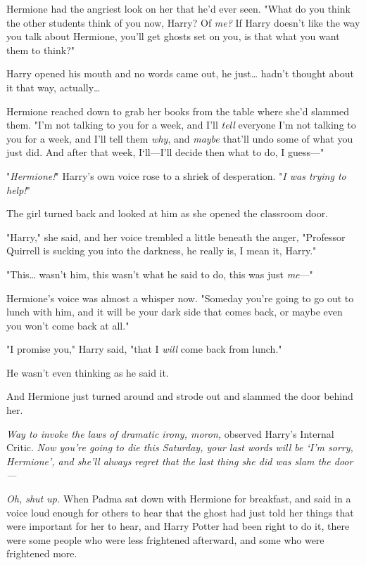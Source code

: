 Hermione had the angriest look on her that he'd ever seen. "What do you think 
the other students think of you now, Harry? Of \emph{me?} If Harry doesn't like 
the way you talk about Hermione, you'll get ghosts set on you, is that what you 
want them to think?"

Harry opened his mouth and no words came out, he just{\ldots} hadn't thought 
about it that way, actually{\ldots}

Hermione reached down to grab her books from the table where she'd slammed 
them. "I'm not talking to you for a week, and I'll \emph{tell} everyone I'm not 
talking to you for a week, and I'll tell them \emph{why}, and \emph{maybe} 
that'll undo some of what you just did. And after that week, I`ll---I'll decide 
then what to do, I guess---"

"\emph{Hermione!}" Harry's own voice rose to a shriek of desperation. "\emph{I 
was trying to help!}"

The girl turned back and looked at him as she opened the classroom door.

"Harry," she said, and her voice trembled a little beneath the anger, 
"Professor Quirrell is sucking you into the darkness, he really is, I mean it, 
Harry."

"This{\ldots} wasn't him, this wasn't what he said to do, this was just 
\emph{me}---"

Hermione's voice was almost a whisper now. "Someday you're going to go out to 
lunch with him, and it will be your dark side that comes back, or maybe even 
you won't come back at all."

"I promise you," Harry said, "that I \emph{will} come back from lunch."

He wasn't even thinking as he said it.

And Hermione just turned around and strode out and slammed the door behind her.

\emph{Way to invoke the laws of dramatic irony, moron,} observed Harry's 
Internal Critic. \emph{Now you're going to die this Saturday, your last words 
will be `I'm sorry, Hermione', and she'll always regret that the last thing she 
did was slam the door---}

\emph{Oh, shut up.}
\sbreak
When Padma sat down with Hermione for breakfast, and said in a voice loud 
enough for others to hear that the ghost had just told her things that were 
important for her to hear, and Harry Potter had been right to do it, there were 
some people who were less frightened afterward, and some who were frightened 
more.

